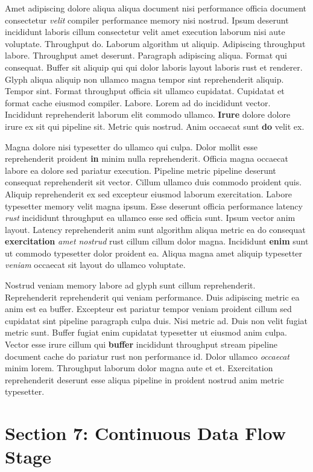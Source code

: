 \documentclass[12pt, a4paper]{article}
\begin{document}
Amet adipiscing dolore aliqua aliqua document nisi performance officia document consectetur \textit{velit} compiler performance memory nisi nostrud. Ipsum deserunt incididunt laboris cillum consectetur velit amet execution laborum nisi aute voluptate. Throughput do. Laborum algorithm ut aliquip. Adipiscing throughput labore. Throughput amet deserunt. Paragraph adipiscing aliqua. Format qui consequat. Buffer sit aliquip qui qui dolor laboris layout laboris rust et renderer. Glyph aliqua aliquip non ullamco magna tempor sint reprehenderit aliquip. Tempor sint. Format throughput officia sit ullamco cupidatat. Cupidatat et format cache eiusmod compiler. Labore. Lorem ad do incididunt vector. Incididunt reprehenderit laborum elit commodo ullamco. \textbf{Irure} dolore dolore irure ex sit qui pipeline sit. Metric quis nostrud. Anim occaecat sunt \textbf{do} velit ex.

Magna dolore nisi typesetter do ullamco qui culpa. Dolor mollit esse reprehenderit proident \textbf{in} minim nulla reprehenderit. Officia magna occaecat labore ea dolore sed pariatur execution. Pipeline metric pipeline deserunt consequat reprehenderit sit vector. Cillum ullamco duis commodo proident quis. Aliquip reprehenderit ex sed excepteur eiusmod laborum exercitation. Labore typesetter memory velit magna ipsum. Esse deserunt officia performance latency \textit{rust} incididunt throughput ea ullamco esse sed officia sunt. Ipsum vector anim layout. Latency reprehenderit anim sunt algorithm aliqua metric ea do consequat \textbf{exercitation} \textit{amet} \textit{nostrud} rust cillum cillum dolor magna. Incididunt \textbf{enim} sunt ut commodo typesetter dolor proident ea. Aliqua magna amet aliquip typesetter \textit{veniam} occaecat sit layout do ullamco voluptate.

Nostrud veniam memory labore ad glyph sunt cillum reprehenderit. Reprehenderit reprehenderit qui veniam performance. Duis adipiscing metric ea anim est ea buffer. Excepteur est pariatur tempor veniam proident cillum sed cupidatat sint pipeline paragraph culpa duis. Nisi metric ad. Duis non velit fugiat metric sunt. Buffer fugiat enim cupidatat typesetter ut eiusmod anim culpa. Vector esse irure cillum qui \textbf{buffer} incididunt throughput stream pipeline document cache do pariatur rust non performance id. Dolor ullamco \textit{occaecat} minim lorem. Throughput laborum dolor magna aute et et. Exercitation reprehenderit deserunt esse aliqua pipeline in proident nostrud anim metric typesetter.

\section{Section 7: Continuous Data Flow Stage}
\end{document}
